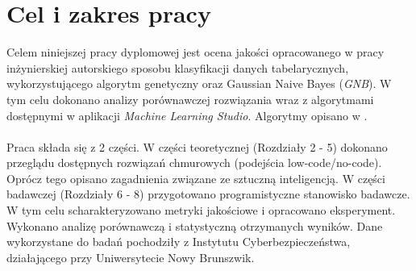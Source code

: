 \section{Cel i zakres pracy}
Celem niniejszej pracy dyplomowej jest ocena jakości opracowanego w pracy inżynierskiej autorskiego sposobu klasyfikacji danych tabelarycznych, wykorzystującego algorytm genetyczny oraz Gaussian Naive Bayes (\textit{GNB}). W tym celu dokonano analizy porównawczej rozwiązania wraz z algorytmami dostępnymi w aplikacji \textit{Machine Learning Studio}. Algorytmy opisano w .
\\ \\
Praca składa się z 2 części. W części teoretycznej (Rozdziały 2 - 5) dokonano przeglądu dostępnych rozwiązań chmurowych (podejścia low-code/no-code). Oprócz tego opisano zagadnienia związane ze sztuczną inteligencją. W części badawczej (Rozdziały 6 - 8) przygotowano programistyczne stanowisko badawcze. W tym celu scharakteryzowano metryki jakościowe i opracowano eksperyment. Wykonano analizę porównawczą i statystyczną otrzymanych wyników. Dane wykorzystane do badań pochodziły z Instytutu Cyberbezpieczeństwa, działającego przy Uniwersytecie Nowy Brunszwik.

